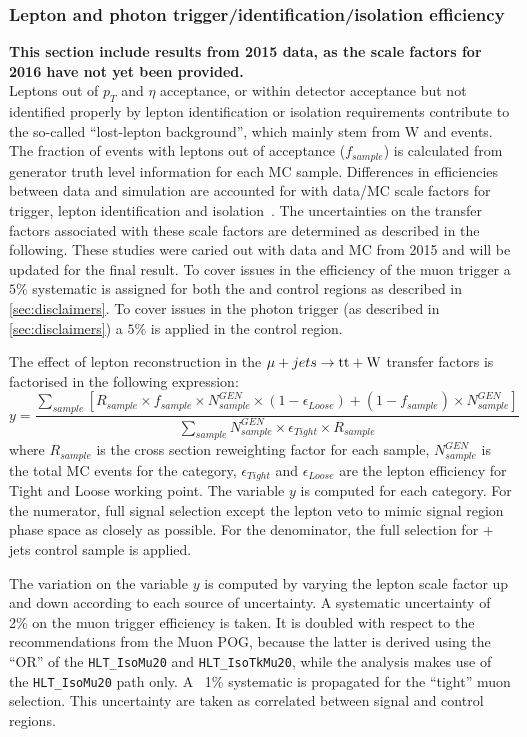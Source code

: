 \subsubsection*{Lepton and photon trigger/identification/isolation efficiency}
\label{sec:tfSyst_lepton}
\textbf{This section include results from 2015 data, as the scale factors for 2016 have not yet been provided.}\\
Leptons out of $p_{T}$ and $\eta$ acceptance, or within detector
acceptance but not identified properly by lepton identification or isolation
requirements contribute to the so-called ``lost-lepton background'', 
which mainly stem from W and \ttbar events. 
The fraction of events with leptons out of acceptance ($f_{sample}$)
is calculated from generator truth level information for each MC
sample. Differences in efficiencies between data and simulation are
accounted for with data/MC scale
factors for trigger, lepton identification and isolation~\cite{twiki-leptonSF}. 
The uncertainties on the transfer factors associated 
with these scale factors are determined as described in the following.
These studies were caried out with data and MC from 2015 and will be updated 
for the final result. To cover issues in the efficiency of the
muon trigger a $5\%$ systematic is assigned for both the \mj and \mmj 
control regions as described in \ref{sec:disclaimers}. To cover 
issues in the photon trigger (as described in \ref{sec:disclaimers}) a $5\%$ is applied in the
\gj control region.

The effect of lepton reconstruction in the $\mu + jets \rightarrow \mathrm{tt+W}$ 
transfer factors is factorised in the following expression: 
\begin{equation}
    \label{eq:lostLepTF}
    y = \frac{\sum_{sample} [ R_{sample} \times f_{sample} \times N^{GEN}_{sample} \times ( 1 - \epsilon_{Loose} ) + ( 1 - f_{sample} ) \times N^{GEN}_{sample} ]}{ \sum_{sample} N^{GEN}_{sample} \times \epsilon_{Tight} \times R_{sample} }
\end{equation}
where $R_{sample}$ is the cross section reweighting factor for each sample, 
$N^{GEN}_{sample}$ is the total MC events for the category, $\epsilon_{Tight}$
and $\epsilon_{Loose}$ are the lepton efficiency for Tight and Loose working 
point. The variable $y$ is computed for each category. For the numerator, full
signal selection except the lepton veto to mimic signal region phase space as
closely as possible. For the denominator, the full selection for \mj + jets 
control sample is applied.

The variation on the variable $y$ is computed by varying the lepton scale factor
up and down according to each source of uncertainty. 
A systematic uncertainty of 2\% on the muon trigger efficiency is taken. 
It is doubled with respect to the recommendations from the Muon POG, because the latter is derived using the 
``OR'' of the \verb!HLT_IsoMu20! and \verb!HLT_IsoTkMu20!, while the analysis makes use of the \verb!HLT_IsoMu20! path only. 
A ~1\% systematic is propagated for the ``tight'' muon selection. 
This uncertainty are taken as correlated between signal and control regions. 


